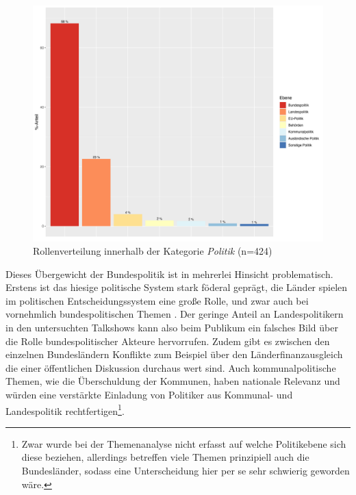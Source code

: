 \begin{figure}[ht]
	\centering
	\includegraphics[width=1\textwidth]{daten/grafiken/plot_politikebenen.png}
	\caption{Rollenverteilung innerhalb der Kategorie \textit{Politik} (n=424)}
	\label{plot:politikebenen}
\end{figure}

Dieses Übergewicht der Bundespolitik ist in mehrerlei Hinsicht problematisch. Erstens ist das hiesige politische System stark föderal geprägt, die Länder spielen im politischen Entscheidungssystem eine große Rolle, und zwar auch bei vornehmlich bundespolitischen Themen \parencite[303-331]{rudzioPolitischeSystemBundesrepublik2006}. Der geringe Anteil an Landespolitikern in den untersuchten Talkshows kann also beim Publikum ein falsches Bild über die Rolle bundespolitischer Akteure hervorrufen. Zudem gibt es zwischen den einzelnen Bundesländern Konflikte zum Beispiel über den Länderfinanzausgleich die einer öffentlichen Diskussion durchaus wert sind. Auch kommunalpolitische Themen, wie die Überschuldung der Kommunen, haben nationale Relevanz und würden eine verstärkte Einladung von Politiker aus Kommunal- und Landespolitik rechtfertigen\footnote{Zwar wurde bei der Themenanalyse nicht erfasst auf welche Politikebene sich diese beziehen, allerdings betreffen viele Themen prinzipiell auch die Bundesländer, sodass eine Unterscheidung hier per se sehr schwierig geworden wäre.}.

